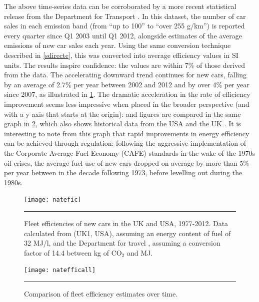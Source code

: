 The above time-series data can be corroborated by a more recent statistical
release from the Department for Transport \citep[table VEH0256]{Df2013licencing}.
In this dataset, the number of car sales in each emission band (from
``up to 100'' to ``over 255 g/km'') is reported every quarter since Q1 2003
until Q1 2012, alongside estimates of the average emissions of new car sales
each year. Using the same conversion technique described in \cref{sdirecte},
this was converted into average efficiency values in SI units. The results
inspire confidence: the values are within 7\% of those derived from
the \citet{Decc2011t} data. The accelerating downward trend continues for new cars,
falling by an average of 2.7\% per year between 2002 and 2012 and by over
4\% per year since 2007, as illustrated in \cref{fnatefic}.
The dramatic acceleration in the rate of efficiency improvement
seems less impressive when placed in the broader perspective (and with a
y axis that starts at the origin):
\citet{Df2013licencing} and \citet{Decc2011t} figures are compared in
the same graph in \cref{fnatefficall}, which also shows historical data from the USA
and the UK \citep{Schipper1993}. It is interesting to note from this graph
that rapid improvements in energy efficiency can be achieved through regulation:
following the aggressive implementation of the
Corporate Average Fuel Economy (CAFE) standards in the wake of the 1970s oil
crises, the average fuel use of new cars dropped on average by more than 5\%
per year between in the decade following 1973, before levelling out during the
1980s. 

\begin{figure}[h]
  \centerline{
    \texttt{[image: natefic]}}
    \rule{35em}{0.5pt}
  \caption[Fleet efficiencies of new cars in the UK and USA, 1977-2012]
  {Fleet efficiencies of new cars in the UK and USA, 1977-2012.
  Data calculated from 
  \citet{Schipper1993} (UK1, USA), assuming an energy content of fuel of
  32 MJ/l, and the Department for travel
  \citep[table VEH0256]{Df2013licencing}, assuming a conversion factor
  of 14.4 between kg of CO$_2$ and MJ.}
  \label{fnatefic}
\end{figure}

\begin{figure}[h]
  \centerline{
    \texttt{[image: natefficall]}}
    \rule{35em}{0.5pt}
  \caption{Comparison of fleet efficiency estimates over time.}
  \label{fnatefficall}
\end{figure}

